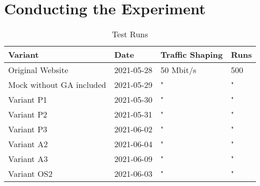 









\section{Conducting the Experiment}







\begin{table}[h]
	\small
	\centering
	\begin{tabular}{ | l | l | l | l | } 
	 \hline
	  Variant \cellcolor{lightgrey} &  Date \cellcolor{lightgrey} & Traffic Shaping \cellcolor{lightgrey} & Runs \cellcolor{lightgrey} \\
	  \hline
	  Original Website & 2021-05-28 & 50 Mbit/s & 500 \\
	  Mock without GA included & 2021-05-29 & " & " \\
	  \hline
	  Variant P1 & 2021-05-30 & " & " \\
	  Variant P2 & 2021-05-31 & " & " \\
	  Variant P3 & 2021-06-02 & " & " \\
	  \hline
	  Variant A2 & 2021-06-04 & " & " \\
	  Variant A3 & 2021-06-09 & " & " \\
	  \hline
	  Variant OS2 & 2021-06-03 & " & " \\
	  \hline
	  \end{tabular}
	\medskip
	\caption{Test Runs}
	\label{table:test_runs}
\end{table}


